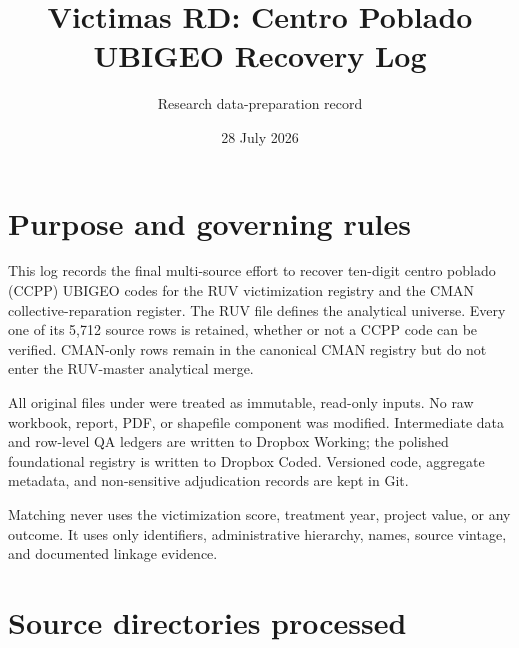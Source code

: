 \documentclass[11pt]{article}
\title{Victimas RD: Centro Poblado UBIGEO Recovery Log}
\author{Research data-preparation record}
\date{28 July 2026}
\newcommand{\code}[1]{\texttt{\detokenize{#1}}}
\begin{document}
\maketitle

\section{Purpose and governing rules}

This log records the final multi-source effort to recover ten-digit centro
poblado (CCPP) UBIGEO codes for the RUV victimization registry and the CMAN
collective-reparation register. The RUV file defines the analytical universe.
Every one of its 5,712 source rows is retained, whether or not a CCPP code can
be verified. CMAN-only rows remain in the canonical CMAN registry but do not
enter the RUV-master analytical merge.

All original files under \code{2 data/1 Raw} were treated as immutable,
read-only inputs. No raw workbook, report, PDF, or shapefile component was
modified. Intermediate data and row-level QA ledgers are written to Dropbox
Working; the polished foundational registry is written to Dropbox Coded.
Versioned code, aggregate metadata, and non-sensitive adjudication records are
kept in Git.

Matching never uses the victimization score, treatment year, project value, or
any outcome. It uses only identifiers, administrative hierarchy, names,
source vintage, and documented linkage evidence.

\section{Source directories processed}
\end{document}
